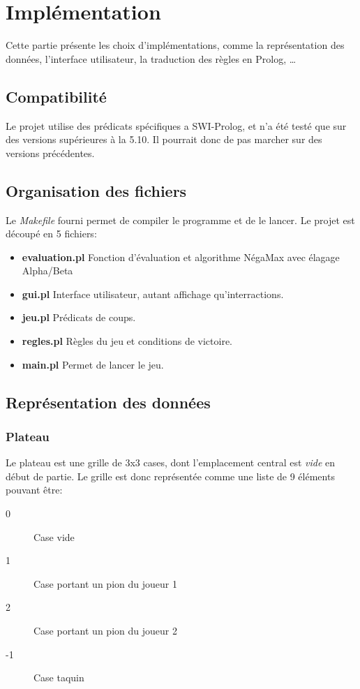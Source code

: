 \documentclass[a4paper,12pt]{article}
\begin{document}
\section{Implémentation}
Cette partie présente les choix d'implémentations, comme la représentation des données, l'interface utilisateur,
la traduction des règles en Prolog, \dots

\subsection{Compatibilité}
Le projet utilise des prédicats spécifiques a SWI-Prolog, et n'a été testé que sur des versions supérieures à la 5.10. Il pourrait donc de pas marcher sur des versions précédentes.

\subsection{Organisation des fichiers}
Le \emph{Makefile} fourni permet de compiler le programme et de le lancer. Le projet est découpé en 5 fichiers:
  \begin{itemize}
    \item \textbf{evaluation.pl} Fonction d'évaluation et algorithme NégaMax avec élagage Alpha/Beta
    \item \textbf{gui.pl} Interface utilisateur, autant affichage qu'interractions.
    \item \textbf{jeu.pl} Prédicats de coups.
    \item \textbf{regles.pl} Règles du jeu et conditions de victoire.
    \item \textbf{main.pl} Permet de lancer le jeu.
  \end{itemize}

\subsection{Représentation des données}
\subsubsection{Plateau}
Le plateau est une grille de 3x3 cases, dont l'emplacement central est \emph{vide} en début de partie.
Le grille est donc représentée comme une liste de 9 éléments pouvant être:
  \begin{description}
    \item[0]  Case vide
    \item[1]  Case portant un pion du joueur 1
    \item[2]  Case portant un pion du joueur 2
    \item[-1] Case taquin
  \end{description}
  
\end{document}
